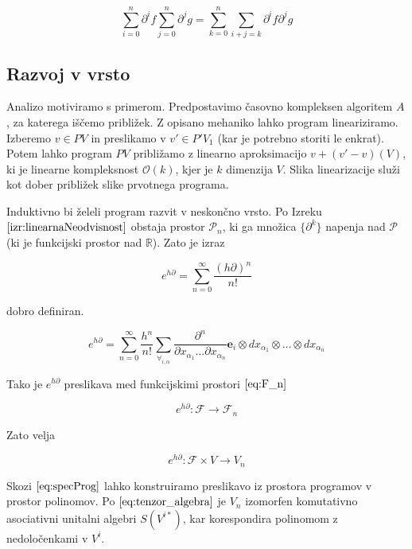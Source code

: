 \documentclass{article}
\newcommand{\RR}{\mathbb{R}}
\newcommand{\e}{\mathbf{e}}
\newcommand{\F}{\mathcal{F}}
\newcommand{\dP}{\mathcal{P}}
\newcommand{\D}{\partial}
\begin{document}
\begin{equation}\label{eq:P_prod}
	\sum\limits_{i=0}^{n}\D^if\sum\limits_{j=0}^{n}\D^jg=\sum\limits_{k=0}^{n}\sum\limits_{i+j=k}\D^if\D^jg
\end{equation}

 \subsection{Razvoj v vrsto}\label{sec:Vrsta}
  
  Analizo motiviramo s primerom. Predpostavimo časovno kompleksen algoritem $A$, za katerega iščemo približek. Z opisano mehaniko lahko program lineariziramo.
  Izberemo $v\in PV$ in preslikamo v $v'\in P'V_1$ (kar je potrebno storiti le enkrat). Potem lahko program $PV$ približamo z linearno aproksimacijo $v+(v'-v) (V)$, ki je linearne kompleksnost $\mathcal{O}(k)$, kjer je $k$ dimenzija $V$.
  Slika linearizacije služi kot dober približek slike prvotnega programa.
  
  Induktivno bi želeli program razvit v neskončno vrsto. Po Izreku $\ref{izr:linearnaNeodvisnost}$  obstaja prostor $\dP_n$, ki ga množica $\{\D^k\}$ napenja nad $\dP$ (ki je funkcijski prostor nad $\RR$). Zato je izraz
  
  
 \begin{equation}
 	e^{h\D}=\sum\limits_{n=0}^{\infty}\frac{(h\D)^n}{n!}
 \end{equation}
 
 dobro definiran.
 
 \begin{equation}\label{eq:e^d}
 	e^{h\D}=\sum\limits_{n=0}^{\infty}\frac{h^n}{n!}\sum_{\forall_{i,\alpha}}\frac{\partial^n}{\partial
 		    x_{\alpha_1}\ldots \partial x_{\alpha_n}}\e_i\otimes
 		  dx_{\alpha_1}\otimes\ldots \otimes dx_{\alpha_n}
 \end{equation}
 
 Tako je $e^{h\D}$ preslikava med funkcijskimi prostori $\eqref{eq:F_n}$
 
 \begin{equation}
 	e^{h\D}:\F\to\F_n
 \end{equation}
 
 Zato velja
  
  \begin{equation}\label{eq:specProg}
  	e^{h\D}:\F\times V\to V_n
  \end{equation}
  
 
Skozi $\eqref{eq:specProg}$ lahko konstruiramo preslikavo iz prostora programov v prostor polinomov.  Po $\eqref{eq:tenzor_algebra}$ je $V_n$ izomorfen komutativno asociativni unitalni algebri $S(V^{i*})$, kar korespondira polinomom z nedoločenkami v $V^i$.
 
\end{document}
